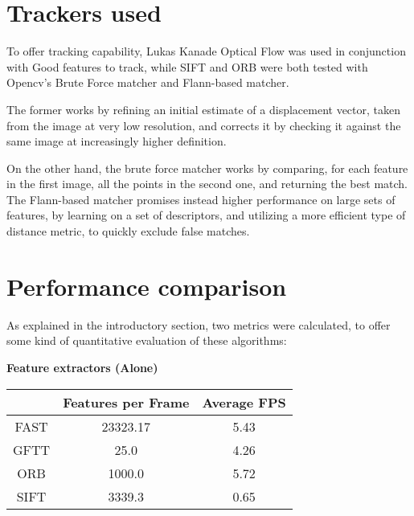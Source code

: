 \documentclass[conference]{IEEEtran}
\begin{document}

\section{Trackers used} 

To offer tracking capability, Lukas Kanade Optical Flow was used in conjunction with Good features to track, 
while SIFT and ORB were both tested with Opencv's Brute Force matcher and Flann-based matcher.

The former works by refining an initial estimate of a displacement vector, taken from the image at very low resolution, 
and corrects it by checking it against the same image  at increasingly higher definition.

On the other hand, the brute force matcher works by comparing, for each feature in the first image, 
all the points in the second one, and returning the best match.
The Flann-based matcher promises instead higher performance  on large sets of features, 
by learning on a set of descriptors, and utilizing a more efficient type of distance metric, 
to quickly exclude false matches.


\section{Performance comparison}

As explained in the introductory section, two metrics were calculated, to offer some kind 
of quantitative evaluation of these algorithms:  

\begin{center}
	\textbf{Feature extractors (Alone)}\\
	\begin{tabular}{||c c c||} 
	 \hline
	 & Features per Frame & Average FPS \\ [0.5ex] 
	 \hline\hline
	 FAST & 23323.17 & 5.43 \\ 
	 \hline
	 GFTT & 25.0 & 4.26 \\
	 \hline
	 ORB & 1000.0 & 5.72 \\
	 \hline
	 SIFT & 3339.3 & 0.65 \\
	 \hline
	\end{tabular}
\end{center}
\end{document}
